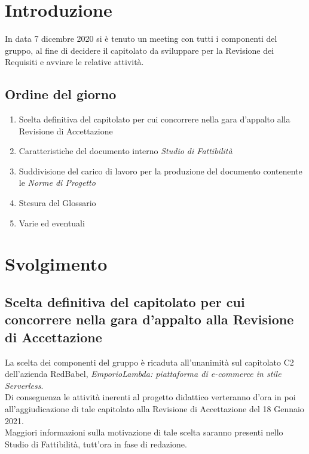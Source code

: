\section{Introduzione}
In data 7 dicembre 2020 si è tenuto un meeting con tutti i componenti del gruppo, al fine
di decidere il capitolato da sviluppare per la Revisione dei Requisiti e avviare le relative attività.

\subsection{Ordine del giorno}
\begin{enumerate}
    \item Scelta definitiva del capitolato per cui concorrere nella gara d'appalto alla Revisione di Accettazione
    \item Caratteristiche del documento interno \textit{Studio di Fattibilità}
    \item Suddivisione del carico di lavoro per la produzione del documento contenente le \textit{Norme di Progetto}
    \item Stesura del Glossario
    \item Varie ed eventuali
\end{enumerate}

\section{Svolgimento}
\subsection{Scelta definitiva del capitolato per cui concorrere nella gara d'appalto alla Revisione di Accettazione}
	La scelta dei componenti del gruppo è ricaduta all'unanimità sul capitolato C2 dell'azienda RedBabel, \textit{EmporioLambda: piattaforma di e-commerce in stile Serverless}.\\
	Di conseguenza le attività inerenti al progetto didattico verteranno d'ora in poi all'aggiudicazione di tale capitolato alla Revisione di Accettazione del 18 Gennaio 2021.\\
	Maggiori informazioni sulla motivazione di tale scelta saranno presenti nello Studio di Fattibilità, tutt'ora in fase di redazione.
	
